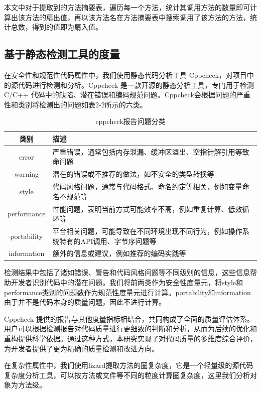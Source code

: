 本文中对于提取到的方法摘要表，遍历每一个方法，统计其调用方法的数量即可计算出该方法的扇出值，再以该方法名在方法摘要表中搜索调用了该方法的方法，统计总数，得到的值即为扇入值。

\subsection{基于静态检测工具的度量}

在安全性和规范性代码属性中，我们使用静态代码分析工具 Cppcheck，对项目中的源代码进行检测和分析。Cppcheck 是一款开源的静态分析工具，专门用于检测 C/C++ 代码中的缺陷、潜在错误和编码规范问题。Cppcheck会根据问题的严重性和类别将检测出的问题如表2-2所示的六类。

\begin{table}[htbp]
\caption{cppcheck报告问题分类}
\vspace{0.5em}\centering\wuhao
\begin{tabular}{cp{12cm}}
\toprule
类别 & 描述 \\
\midrule
error & 严重错误，通常包括内存泄漏、缓冲区溢出、空指针解引用等致命问题 \\
warning & 潜在的错误或不推荐的做法，如不安全的类型转换等 \\
style & 代码风格问题，通常与代码格式、命名约定等相关，例如变量命名不规范等 \\
performance & 性能问题，表明当前方式可能效率不高，例如重复计算、低效循环等 \\
portability & 平台相关问题，可能导致在不同环境出现不同行为，例如操作系统特有的API调用、字节序问题等 \\
information & 额外的信息或建议，例如推荐的编码实践等 \\
\bottomrule
\end{tabular}
\end{table}


检测结果中包括了诸如错误、警告和代码风格问题等不同级别的信息，这些信息帮助开发者识别代码中的潜在问题。我们将前两类作为安全性度量元，将style和performance类别的问题数作为规范性度量元进行计算。portability和information由于并不是代码本身的质量问题，因此不进行计算。

Cppcheck 提供的报告与其他度量指标相结合，共同构成了全面的质量评估体系。用户可以根据检测报告对代码质量进行更细致的判断和分析，从而为后续的优化和重构提供科学依据。通过这种方式，本研究实现了对代码质量的多维度综合评价，为开发者提供了更为精确的质量检测和改进方向。

在复杂性属性中，我们使用lizard提取方法的圈复杂度，它是一个轻量级的源代码复杂度分析工具，可以按方法或文件等不同的粒度计算圈复杂度，这里我们分析对象为方法级。


